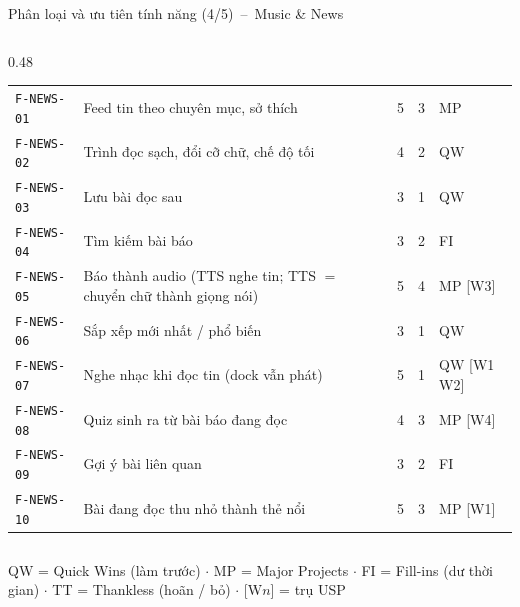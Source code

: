 \documentclass[aspectratio=169]{beamer}
\begin{document}
\begin{frame}{Phân loại và ưu tiên tính năng (4/5)~--~Music \& News}
\begin{columns}
\begin{column}{0.48\textwidth}
\begin{center}
\begin{tabular}{@{}p{1.35cm}p{3.2cm}p{0.22cm}p{0.22cm}p{1.15cm}@{}}
\midrule
\texttt{F-NEWS-01} & Feed tin theo chuyên mục, sở thích & 5 & 3 & MP \\
\texttt{F-NEWS-02} & Trình đọc sạch, đổi cỡ chữ, chế độ tối & 4 & 2 & QW \\
\texttt{F-NEWS-03} & Lưu bài đọc sau & 3 & 1 & QW \\
\texttt{F-NEWS-04} & Tìm kiếm bài báo & 3 & 2 & FI \\
\texttt{F-NEWS-05} & Báo thành audio (TTS nghe tin; TTS $=$ chuyển chữ thành giọng nói) & 5 & 4 & MP [W3] \\
\texttt{F-NEWS-06} & Sắp xếp mới nhất / phổ biến & 3 & 1 & QW \\
\texttt{F-NEWS-07} & Nghe nhạc khi đọc tin (dock vẫn phát) & 5 & 1 & QW [W1 W2] \\
\texttt{F-NEWS-08} & Quiz sinh ra từ bài báo đang đọc & 4 & 3 & MP [W4] \\
\texttt{F-NEWS-09} & Gợi ý bài liên quan & 3 & 2 & FI \\
\texttt{F-NEWS-10} & Bài đang đọc thu nhỏ thành thẻ nổi & 5 & 3 & MP [W1] \\
\bottomrule
\end{tabular}
    \end{center}\end{column}
  \end{columns}
  \vfill
  {\tiny\color{brandgray} QW = Quick Wins (làm trước) $\cdot$ MP = Major Projects $\cdot$ FI = Fill-ins (dư thời gian) $\cdot$ TT = Thankless (hoãn / bỏ) $\cdot$ [W$n$] = trụ USP}
\end{frame}
\end{document}
